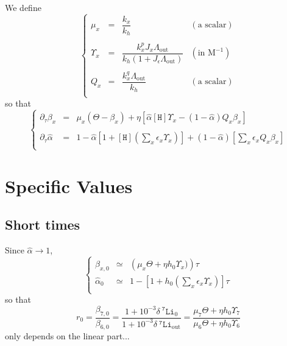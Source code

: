 \documentclass[aps,onecolumn,10pt]{revtex4}
\newcommand{\mychem}[1]{\mathtt{#1}}
\newcommand{\myconc}[1]{\left\lbrack{#1}\right\rbrack}
\newcommand{\spLi}[1]{{~^{\mychem{#1}}\mychem{Li}}}
\newcommand{\spproton}{\mychem{H}}
\newcommand{\proton}{\myconc{\spproton}}
\newcommand{\deltaLi}{ {\delta\!\!\!\spLi{7}} }
\newcommand{\deltaLiOut}{{\deltaLi}_{\mathrm{out}}}
\newcommand{\LiAll}{\Lambda}
\newcommand{\LiAllOut}{{\LiAll}_{\mathrm{out}}}
\begin{document}
We define 
\begin{equation}
\left\lbrace
\begin{array}{rcll}
	\mu_x      & = & \dfrac{k_x}{k_h} & (\text{a scalar})\\
	\\
	\Upsilon_x & = & \dfrac{k_x^pJ_x \LiAllOut}{k_h\left(1+ J_\epsilon\LiAllOut\right)} & (\text{in M}^{-1})
	 \\
	 \\
	Q_x & = & \dfrac{k_x^q \LiAllOut}{k_h} & (\text{a scalar})\\
\end{array}
\right.
\end{equation}
so that
\begin{equation}
\left\lbrace
\begin{array}{rcl}
\partial_\tau \beta_x  & = &  \mu_x \left(\Theta -\beta_x \right) + \eta \left[ \hat\alpha \proton \Upsilon_x  -  \left(1-\hat\alpha\right) Q_x\beta_x \right] \\
\\
	\partial_\tau \hat\alpha & = & 1 - 
		\hat\alpha \left\lbrack 1+ \proton \left(\sum_x \epsilon_x \Upsilon_x \right)\right] + (1-\hat\alpha) \left\lbrack {\sum_x  \epsilon_x Q_x \beta_x }  \right\rbrack \\
\end{array}
\right.
\end{equation}

\section{Specific Values}
\subsection{Short times}
Since $\hat\alpha\to1$,
\begin{equation}
\left\lbrace
\begin{array}{rcl}
\beta_{x,0} & \simeq & \left(\mu_x \Theta + \eta h_0 \Upsilon_x)\right)\tau\\
\hat\alpha_{0} & \simeq & 1 - \left[1+h_0 \left(\sum_x \epsilon_x \Upsilon_x\right)\right] \tau\\
\end{array}
\right.
\end{equation}
so that
\begin{equation}
	\label{eq:r0}
	r_0 = \dfrac{\beta_{7,0}}{\beta_{6,0}} = \dfrac{1+10^{-3}\deltaLi_0}{1+10^{-3}\deltaLiOut}
	 = \dfrac{\mu_7\Theta+\eta h_0 \Upsilon_7}{\mu_6\Theta+\eta h_0 \Upsilon_6}
\end{equation}
only depends on the linear part...
\end{document}
